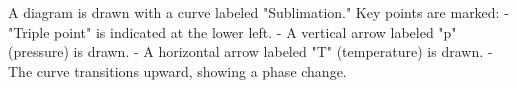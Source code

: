 A diagram is drawn with a curve labeled "Sublimation."  
Key points are marked:  
- "Triple point" is indicated at the lower left.  
- A vertical arrow labeled "p" (pressure) is drawn.  
- A horizontal arrow labeled "T" (temperature) is drawn.  
- The curve transitions upward, showing a phase change.